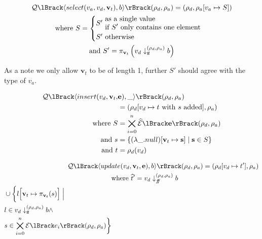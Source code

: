 \begin{gather}
        \sqlsem{\langle select(v_a, v_d, \mathbf{v}_t), b \rangle}(\rho_d, \rho_a) = (\rho_d, \rho_a[v_a \mapsto S]) \\
        \text{where } S = \begin{cases}
                               S' \begin{split}
                                      & \text{ as a single value } \\
                                      & \text{ if $S'$ only contains one element}
                               \end{split} \\
                               S' \text{ otherwise}
        \end{cases}\\
        \text{and } S' = \pi_{\mathbf{v}_t} \left( v_d \downarrow_{\true}^{(\rho_d, \rho_a)} b \right)
\end{gather}

As a note we only allow $\mathbf{v}_t$ to be of length 1, further $S'$ should agree with the type of $v_a$.

\begin{align}
    \sqlsem{\langle insert(v_d, \mathbf{v}_t, &\mathbf{e}), \_ \rangle}(\rho_d, \rho_a) \\
     &= (\rho_d[v_d\mapsto t \text{ with $s$ added}], \rho_a) \\
    \text{where } S &= \bigtimes_{i = 0}^{n} \absexpsem{\mathbf{e}}(\rho_d, \rho_a) \\
    \text{and } s &= \left\{ (\lambda\_.\mnull)[\mathbf{v}_t \mapsto \mathbf{s}] \;\middle|\; \mathbf{s} \in S\right\} \nonumber\\
    \text{and } t &= \rho_d(v_d)
\end{align}

\begin{align}
    \sqlsem{\langle upd&ate(v_d, \mathbf{v}_t, \mathbf{e}), b \rangle} (\rho_d, \rho_a) = (\rho_d[v_d \mapsto t'], \rho_a) \\
    &\text{where }\abstable' = v_d \downarrow_{\false}^{(\rho_d, \rho_a)} b \\
    \begin{split}
        &\cup \biggl\{ l\Bigl[ \mathbf{v}_t \mapsto \pi_{\mathbf{v}_t}(s) \Bigr] \;\Big|\;\\
        &l \in v_d \downarrow_{\true}^{(\rho_d, \rho_a)} b \land \\
        &s \in \bigtimes_{i = 0}^{n} \expsem{e_i}(\rho_d, \rho_a) \biggr\}
    \end{split}
\end{align}

